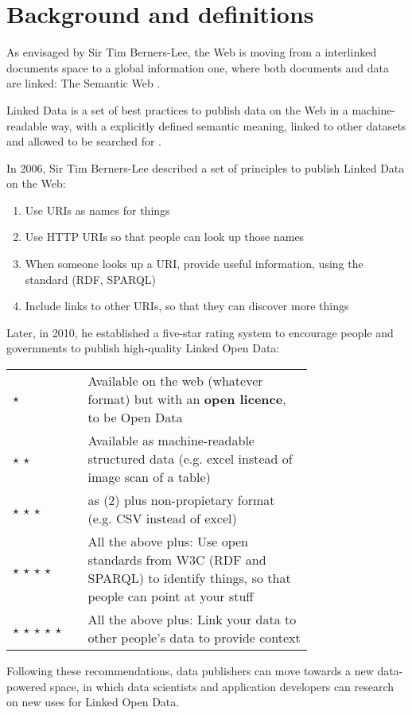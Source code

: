 \section{Background and definitions}
\label{subsec:background}

As envisaged by Sir Tim Berners-Lee, the Web is moving from a interlinked documents space to a global information one, where both documents and data are linked: The Semantic Web \cite{berners2001semantic}.

Linked Data is a set of best practices to publish data on the Web in a machine-readable way, with a explicitly defined semantic meaning, linked to other datasets and allowed to be searched for \cite{bizer2009linked}.

In 2006, Sir Tim Berners-Lee described a set of principles to publish Linked Data on the Web:

\begin{enumerate}
  \item Use URIs as names for things
  \item Use HTTP URIs so that people can look up those names
  \item When someone looks up a URI, provide useful information, using the standard (RDF, SPARQL)
  \item Include links to other URIs, so that they can discover more things \\[\baselineskip]
\end{enumerate} 

Later, in 2010, he established a five-star rating system to encourage people and governments to publish high-quality Linked Open Data: 

\begin{tabular}{ l p{0.75\linewidth} }
  $\star$ & Available on the web (whatever format) but with an \textbf{open licence}, to be Open Data \\
  $\star$ $\star$ & Available as machine-readable structured data (e.g. excel instead of image scan of a table) \\
  $\star$ $\star$ $\star$ & as (2) plus non-propietary format (e.g. CSV instead of excel) \\
  $\star$ $\star$ $\star$ $\star$ & All the above plus: Use open standards from W3C (RDF and SPARQL) to identify things, so that people can point at your stuff \\
  $\star$ $\star$ $\star$ $\star$ $\star$ & All the above plus: Link your data to other people's data to provide context \\[\baselineskip]
\end{tabular}

Following these recommendations, data publishers can move towards a new data-powered space, in which data scientists and application developers can research on new uses for Linked Open Data.